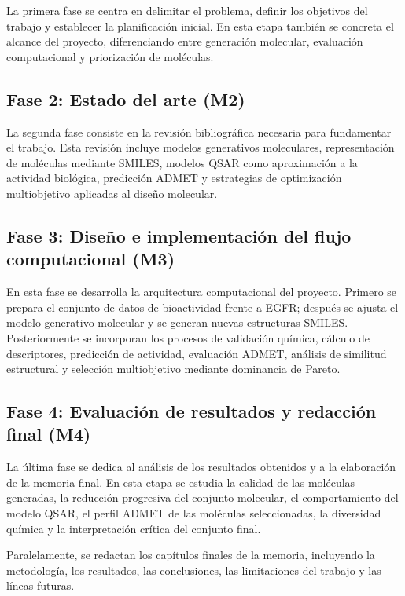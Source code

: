 \documentclass[IB]{TFUOC}%
\begin{document}
La primera fase se centra en delimitar el problema, definir los objetivos del trabajo y establecer la planificación inicial. En esta etapa también se concreta el alcance del proyecto, diferenciando entre generación molecular, evaluación computacional y priorización de moléculas.

\subsection{Fase 2: Estado del arte (M2)}

La segunda fase consiste en la revisión bibliográfica necesaria para fundamentar el trabajo. Esta revisión incluye modelos generativos moleculares, representación de moléculas mediante SMILES, modelos QSAR como aproximación a la actividad biológica, predicción ADMET y estrategias de optimización multiobjetivo aplicadas al diseño molecular.

\subsection{Fase 3: Diseño e implementación del flujo computacional (M3)}

En esta fase se desarrolla la arquitectura computacional del proyecto. Primero se prepara el conjunto de datos de bioactividad frente a EGFR; después se ajusta el modelo generativo molecular y se generan nuevas estructuras SMILES. Posteriormente se incorporan los procesos de validación química, cálculo de descriptores, predicción de actividad, evaluación ADMET, análisis de similitud estructural y selección multiobjetivo mediante dominancia de Pareto.

\subsection{Fase 4: Evaluación de resultados y redacción final (M4)}

La última fase se dedica al análisis de los resultados obtenidos y a la elaboración de la memoria final. En esta etapa se estudia la calidad de las moléculas generadas, la reducción progresiva del conjunto molecular, el comportamiento del modelo QSAR, el perfil ADMET de las moléculas seleccionadas, la diversidad química y la interpretación crítica del conjunto final.

Paralelamente, se redactan los capítulos finales de la memoria, incluyendo la metodología, los resultados, las conclusiones, las limitaciones del trabajo y las líneas futuras.
\end{document}

